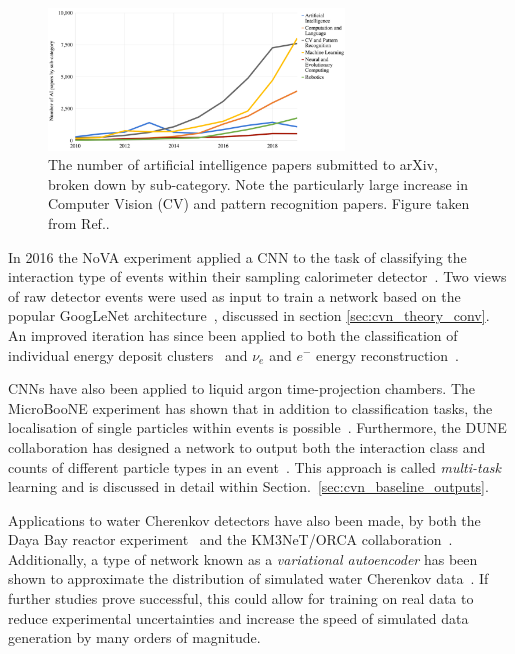 \begin{figure} %
    \includegraphics[width=0.7\textwidth]{diagrams/6-cvn/papers.png}
    \caption[papers short]
    {The number of artificial intelligence papers submitted to arXiv, broken down by sub-category.
        Note the particularly large increase in Computer Vision (CV) and pattern recognition
        papers. Figure taken from Ref.\cite{perrault2019}.}
    \label{fig:papers}
\end{figure}

In 2016 the NoVA experiment applied a CNN to the task of classifying the interaction type of
events within their sampling calorimeter detector~\cite{aurisano2016}. Two views of raw detector
events were used as input to train a network based on the popular GoogLeNet
architecture~\cite{szegedy2015}, discussed in section \ref{sec:cvn_theory_conv}. An improved
iteration has since been applied to both the classification of individual energy deposit
clusters~\cite{psihas2019} and $\nu_{e}$ and $e^{-}$ energy reconstruction~\cite{baldi2019}.

CNNs have also been applied to liquid argon time-projection chambers. The MicroBooNE experiment
has shown that in addition to classification tasks, the localisation of single particles within
events is possible~\cite{acciarri2017}. Furthermore, the DUNE collaboration has designed a network
to output both the interaction class and counts of different particle types in an
event~\cite{collaboration2020, abi2020}. This approach is called \emph{multi-task} learning and is
discussed in detail within Section.~\ref{sec:cvn_baseline_outputs}.

Applications to water Cherenkov detectors have also been made, by both the Daya Bay reactor
experiment~\cite{racah2016} and the KM3NeT/ORCA collaboration~\cite{aiello2020}. Additionally, a
type of network known as a \emph{variational autoencoder} has been shown to approximate the
distribution of simulated water Cherenkov data~\cite{abhishek2019}. If further studies prove
successful, this could allow for training on real data to reduce experimental uncertainties and
increase the speed of simulated data generation by many orders of magnitude.

